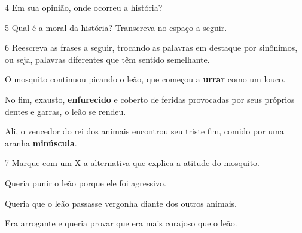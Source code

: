 
\num{4} Em sua opinião, onde ocorreu a história?


\num{5} Qual é a moral da história? Transcreva no espaço a seguir.


\num{6} Reescreva as frases a seguir, trocando as palavras em destaque por
sinônimos, ou seja, palavras diferentes que têm sentido
semelhante.


\begin{escolha}
\item O mosquito continuou picando o leão, que começou a \textbf{urrar}
como um louco. 



\item No fim, exausto, \textbf{enfurecido} e coberto de feridas provocadas por seus próprios dentes e garras, o leão se rendeu.



\item Ali, o vencedor do rei dos animais encontrou seu triste fim,
comido por uma aranha \textbf{minúscula}.

\end{escolha}

\num{7} Marque com um X a alternativa que explica a atitude do mosquito.

\begin{boxlist}
 Queria punir o leão porque ele foi agressivo.

 Queria que o leão passasse vergonha diante dos outros animais.

 Era arrogante e queria provar que era mais corajoso que o leão.
\end{boxlist}

